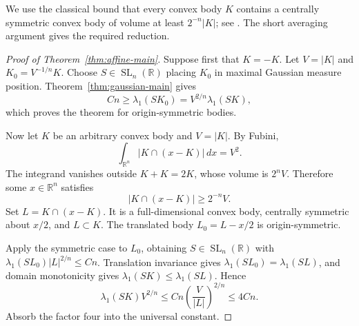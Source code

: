 \documentclass[11pt]{amsart}
\numberwithin{equation}{section}
\theoremstyle{definition}
\theoremstyle{remark}
\newcommand{\R}{\mathbb R}
\DeclareMathOperator{\SL}{SL}
\begin{document}
We use the classical bound that every convex body \(K\) contains a
centrally symmetric convex body of volume at least \(2^{-n}|K|\);
see \cite[Section~1.2]{HSTV22}. The short averaging argument gives the
required reduction.

\begin{proof}[Proof of Theorem~\ref{thm:affine-main}]
Suppose first that \(K=-K\). Let \(V=|K|\) and \(K_0=V^{-1/n}K\).
Choose \(S\in\SL_n(\R)\) placing \(K_0\) in maximal Gaussian measure
position. Theorem~\ref{thm:gaussian-main} gives
\[
Cn\ge\lambda_1(SK_0)
=V^{2/n}\lambda_1(SK),
\]
which proves the theorem for origin-symmetric bodies.

Now let \(K\) be an arbitrary convex body and \(V=|K|\).
By Fubini,
\[
\int_{\R^n}|K\cap(x-K)|\,dx=V^2.
\]
The integrand vanishes outside \(K+K=2K\), whose volume is \(2^nV\).
Therefore some \(x\in\R^n\) satisfies
\[
|K\cap(x-K)|\ge2^{-n}V.
\]
Set \(L=K\cap(x-K)\). It is a full-dimensional convex body,
centrally symmetric about \(x/2\), and \(L\subset K\).
The translated body \(L_0=L-x/2\) is origin-symmetric.

Apply the symmetric case to \(L_0\), obtaining
\(S\in\SL_n(\R)\) with
\(\lambda_1(SL_0)|L|^{2/n}\le Cn\).
Translation invariance gives
\(\lambda_1(SL_0)=\lambda_1(SL)\), and domain monotonicity gives
\(\lambda_1(SK)\le\lambda_1(SL)\). Hence
\[
\lambda_1(SK)V^{2/n}
\le Cn\left(\frac{V}{|L|}\right)^{2/n}
\le4Cn.
\]
Absorb the factor four into the universal constant.
\end{proof}
\end{document}

